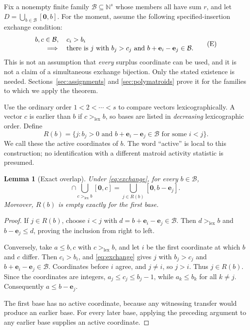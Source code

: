 \documentclass[11pt]{article}
\numberwithin{equation}{section}
\newtheorem{lemma}[theorem]{Lemma}
\theoremstyle{definition}
\theoremstyle{remark}
\newcommand{\N}{\mathbb N}
\newcommand{\ee}{\mathbf e}
\newcommand{\zero}{\mathbf 0}
\newcommand{\B}{\mathcal B}
\newcommand{\lex}{\mathrm{lex}}
\begin{document}
Fix a nonempty finite family $\B\subseteq\N^s$ whose members all have sum $r$,
and let $D=\bigcup_{b\in\B}[\zero,b]$. For the moment, assume the following
specified-insertion exchange condition:
\begin{equation}
 \begin{split}
 &b,c\in\B,\quad c_i>b_i\\[-0.2em]
 &\hspace{1.5em}\Longrightarrow\quad
 \text{there is }j\text{ with }b_j>c_j
 \text{ and }b+\ee_i-\ee_j\in\B.
 \end{split}
 \tag{E}\label{eq:exchange}
\end{equation}
This is not an assumption that \emph{every} surplus coordinate can be used,
and it is not a claim of a simultaneous exchange bijection. Only the stated
existence is needed. Sections~\ref{sec:assignments} and \ref{sec:polymatroids}
prove it for the families to which we apply the theorem.

Use the ordinary order $1<2<\cdots<s$ to compare vectors lexicographically.
A vector $c$ is earlier than $b$ if $c>_{\lex}b$, so bases are listed in
\emph{decreasing} lexicographic order. Define
\begin{equation}
 R(b)=\{j:b_j>0\text{ and }b+\ee_i-\ee_j\in\B
                        \text{ for some }i<j\}.
 \label{eq:active}
\end{equation}
We call these the active coordinates of $b$. The word ``active'' is local to
this construction; no identification with a different matroid activity
statistic is presumed.

\begin{lemma}[Exact overlap]
\label{lem:overlap}
Under \eqref{eq:exchange}, for every $b\in\B$,
\begin{equation}
 [\zero,b]\cap\bigcup_{c>_{\lex}b}[\zero,c]
       =\bigcup_{j\in R(b)}[\zero,b-\ee_j].
 \label{eq:overlap}
\end{equation}
Moreover, $R(b)$ is empty exactly for the first base.
\end{lemma}

\begin{proof}
If $j\in R(b)$, choose $i<j$ with $d=b+\ee_i-\ee_j\in\B$. Then
$d>_{\lex}b$ and $b-\ee_j\le d$, proving the inclusion from right to left.

Conversely, take $a\le b,c$ with $c>_{\lex}b$, and let $i$ be the first
coordinate at which $b$ and $c$ differ. Then $c_i>b_i$, and
\eqref{eq:exchange} gives $j$ with $b_j>c_j$ and
$b+\ee_i-\ee_j\in\B$. Coordinates before $i$ agree, and $j\ne i$, so $j>i$.
Thus $j\in R(b)$. Since the coordinates are integers,
$a_j\le c_j\le b_j-1$, while $a_k\le b_k$ for all $k\ne j$.
Consequently $a\le b-\ee_j$.

The first base has no active coordinate, because any witnessing transfer
would produce an earlier base. For every later base, applying the preceding
argument to any earlier base supplies an active coordinate.
\end{proof}
\end{document}
